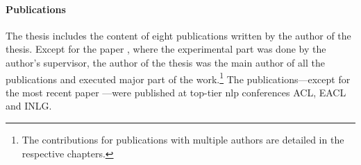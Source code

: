 \paragraph{Publications} The thesis includes the content of eight publications written by the author of the thesis. Except for the paper \citet{dusekEvaluatingSemanticAccuracy2020}, where the experimental part was done by the author's supervisor, the author of the thesis was the main author of all the publications and executed major part of the work.\footnote{The contributions for publications with multiple authors are detailed in the respective chapters.} The publications---except for the most recent paper \citet{kasnerReferenceBasedMetricsAnalyzing2024}---were published at top-tier \ac{nlp} conferences ACL, EACL and INLG.

